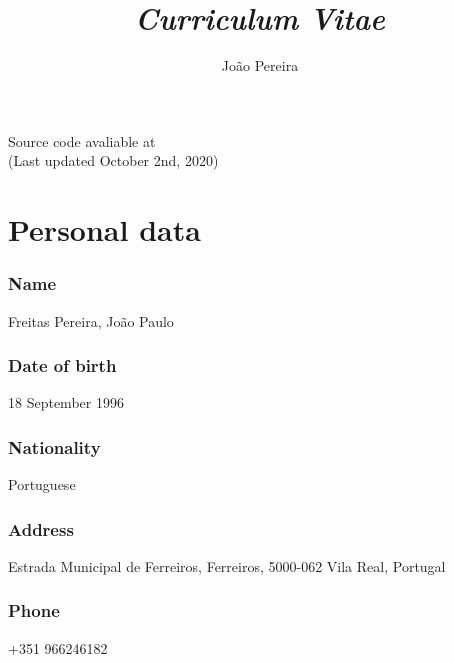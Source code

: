 \documentclass{article}
\renewcommand{\maketitle}{
\begin{center}
\raggedleft
{\Huge\bfseries\theauthor}

\vspace{1mm}
{\large\thetitle}

\vspace{10mm}
\end{center}
}
\begin{document}
\title{\textit{Curriculum Vitae}}
\author{João Pereira}

\begin{minipage}{0.65\textwidth}
\begingroup
\maketitle
\endgroup
\end{minipage}
\begin{minipage}{0.3\textwidth}
\end{minipage}

\begin{flushright}
{\color{gray}
Source code avaliable at \\
(Last updated October 2nd, 2020)
}
\end{flushright}

\section{Personal data}
\subsubsection{Name} 
Freitas Pereira, João Paulo
\subsubsection{Date of birth}
18 September 1996
\subsubsection{Nationality}
Portuguese
\subsubsection{Address}
Estrada Municipal de Ferreiros, Ferreiros, 5000-062 Vila Real, Portugal
\subsubsection{Phone}
+351 966246182
\end{document}
